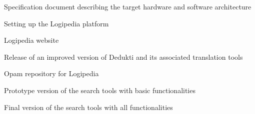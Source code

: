 \begin{workpackage}[id=access,type=RTD,wphases=1-48,
  short=Access,%
  title={Access},
  lead=Inr,InrRM=48,OcaRM=6,EduRM=12]
\begin{tasklist}
\end{tasklist}


\begin{wpdelivs}

  
  \begin{wpdeliv}[due=6,id=archi,dissem=PU,nature=DEM,lead=Inr]{Specification document describing the target hardware and software architecture}
  \end{wpdeliv}

  \begin{wpdeliv}[due=12,id=platform,dissem=PU,nature=DEC,lead=Inr]{Setting up the Logipedia platform}
  \end{wpdeliv}

  \begin{wpdeliv}[due=24,miles=platform,id=web,dissem=PU,nature=DEC,lead=Inr]{Logipedia website}
  \end{wpdeliv}

  \begin{wpdeliv}[due=24,id=dedukti,dissem=PU,nature=OTHER,lead=Inr]{Release of an improved version of Dedukti and its associated translation tools}
  \end{wpdeliv}

  
  \begin{wpdeliv}[due=18,miles=platform, id=opam,dissem=PU,nature=OTHER,lead=Oca]{Opam repository for Logipedia}
  \end{wpdeliv}

  
  \begin{wpdeliv}[due=17,id=search1,dissem=PU,nature=DEM,lead=Inr]{Prototype version of the search tools with basic functionalities}
  \end{wpdeliv}

  \begin{wpdeliv}[due=30,id=search2,dissem=PU,nature=OTHER,lead=Inr]{Final version of the search tools with all functionalities}
  \end{wpdeliv}
    
\end{wpdelivs}

\end{workpackage}

